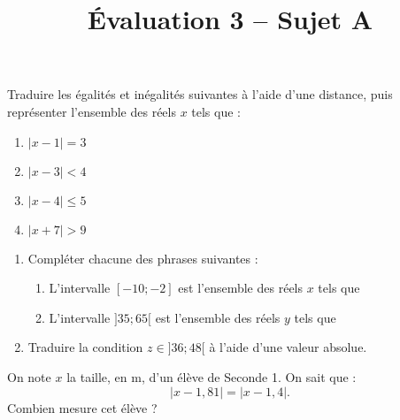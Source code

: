 \documentclass[a4paper,dvipsnames]{article}
\begin{document}
\title{Évaluation 3 -- Sujet A}
\author{}
\date{}

\maketitle{}

\pagestyle{empty}

\exo Traduire les égalités et inégalités suivantes à l'aide d'une distance, puis représenter l'ensemble des réels $x$ tels que :

\begin{multicols}{2}
  \begin{enumerate}
    \item $|x-1|=3$
    \item $|x-3|<4$
    \item $|x-4|\leq5$
    \item $|x+7|>9$
  \end{enumerate}
\end{multicols}

\bigskip

\exo 
\begin{enumerate}
\item Compléter chacune des phrases suivantes :
  \begin{enumerate}
    \item L'intervalle $[-10;-2]$ est l'ensemble des réels $x$ tels que 
    \item L'intervalle $]35;65[$ est l'ensemble des réels $y$ tels que 
  \end{enumerate}
\item Traduire la condition $z\in]36;48[$ à l'aide d'une valeur absolue.
\end{enumerate}

\bigskip

\exo On note $x$ la taille, en m, d'un élève de Seconde 1. On sait que :
\[|x-1,81| = |x-1,4|.\]
Combien mesure cet élève ?
\end{document}
